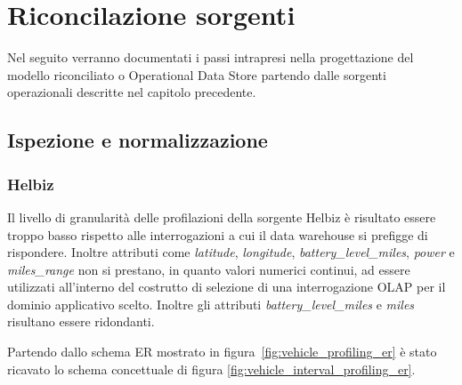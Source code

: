 \chapter{Riconcilazione sorgenti}

Nel seguito verranno documentati i passi intrapresi nella progettazione
del modello riconciliato o Operational Data Store partendo dalle sorgenti
operazionali descritte nel capitolo precedente.

\section{Ispezione e normalizzazione}

\subsection{Helbiz}

Il livello di granularità delle profilazioni della sorgente Helbiz è
risultato essere troppo basso rispetto alle interrogazioni a cui il data
warehouse si prefigge di rispondere. Inoltre attributi come
\textit{latitude}, \textit{longitude}, \textit{battery\_level\_miles},
\textit{power} e \textit{miles\_range} non si prestano, in quanto valori
numerici continui, ad essere utilizzati all'interno del costrutto di
selezione di una interrogazione OLAP per il dominio applicativo
scelto. Inoltre gli attributi \textit{battery\_level\_miles} e
\textit{miles} risultano essere ridondanti.

Partendo dallo schema ER mostrato in figura~\ref{fig:vehicle_profiling_er} è
stato ricavato lo schema concettuale di figura
\ref{fig:vehicle_interval_profiling_er}.

